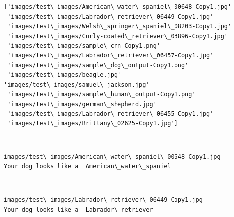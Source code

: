 \documentclass[11pt]{article}
\begin{document}
    \begin{Verbatim}[commandchars=\\\{\}]
['images/test\_images/American\_water\_spaniel\_00648-Copy1.jpg'
 'images/test\_images/Labrador\_retriever\_06449-Copy1.jpg'
 'images/test\_images/Welsh\_springer\_spaniel\_08203-Copy1.jpg'
 'images/test\_images/Curly-coated\_retriever\_03896-Copy1.jpg'
 'images/test\_images/sample\_cnn-Copy1.png'
 'images/test\_images/Labrador\_retriever\_06457-Copy1.jpg'
 'images/test\_images/sample\_dog\_output-Copy1.png'
 'images/test\_images/beagle.jpg' 'images/test\_images/samuel\_jackson.jpg'
 'images/test\_images/sample\_human\_output-Copy1.png'
 'images/test\_images/german\_shepherd.jpg'
 'images/test\_images/Labrador\_retriever\_06455-Copy1.jpg'
 'images/test\_images/Brittany\_02625-Copy1.jpg']

    \end{Verbatim}

    \begin{center}
    \end{center}
    { \hspace*{\fill} \\}
    
    \begin{Verbatim}[commandchars=\\\{\}]
images/test\_images/American\_water\_spaniel\_00648-Copy1.jpg
Your dog looks like a  American\_water\_spaniel

    \end{Verbatim}

    \begin{center}
    \end{center}
    { \hspace*{\fill} \\}
    
    \begin{Verbatim}[commandchars=\\\{\}]
images/test\_images/Labrador\_retriever\_06449-Copy1.jpg
Your dog looks like a  Labrador\_retriever

    \end{Verbatim}

    \begin{center}
    \end{center}
    { \hspace*{\fill} \\}
    
\end{document}
